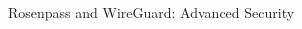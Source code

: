 \begin{frame}{Rosenpass and WireGuard: Advanced Security}
\begin{columns}[fullwidth,T]
\begin{column}{.49\linewidth}
  \end{column}
\end{columns}
\end{frame}




